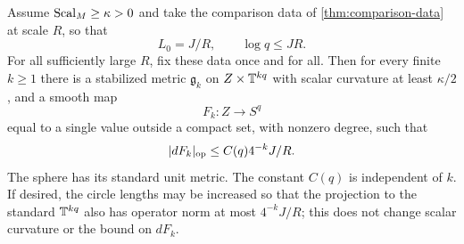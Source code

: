 \begin{corollary}
\label{cor:stabilized-contraction}
Assume $\operatorname{Scal}_M\ge\kappa>0$ and take the comparison data of
\cref{thm:comparison-data} at scale $R$, so that
\[
 L_0=J/R,\qquad \log q\le JR.
\]
For all sufficiently large $R$, fix these data once and for all. Then for every finite $k\ge1$ there is a stabilized metric $\mathfrak g_k$ on $Z\times\mathbb T^{kq}$ with scalar curvature at least $\kappa/2$, and a smooth map
\[
 F_k:Z\longrightarrow S^q
\]
equal to a single value outside a compact set, with nonzero degree, such that
\begin{equation}\label{eq:stabilized-contraction-bound}
 \lvert dF_k\rvert_{\rm op}\le C(q)4^{-k}J/R.
\end{equation}
The sphere has its standard unit metric. The constant $C(q)$ is independent of $k$. If desired, the circle lengths may be increased so that the projection to the standard $\mathbb T^{kq}$ also has operator norm at most $4^{-k}J/R$; this does not change scalar curvature or the bound on $dF_k$.
\end{corollary}

